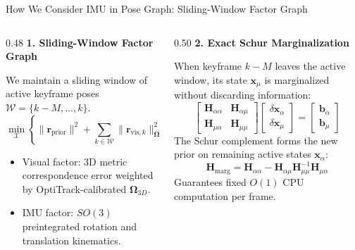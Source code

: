 \documentclass[aspectratio=169, 10pt]{beamer}
\begin{document}
\begin{frame}{How We Consider IMU in Pose Graph: Sliding-Window Factor Graph}
  \begin{columns}[T]
    \begin{column}{0.48\textwidth}
      {\small \textbf{\textcolor{NavyBlue}{1. Sliding-Window Factor Graph}}}
      \vspace{0.1cm}

      We maintain a sliding window of active keyframe poses $\mathcal{W} = \{k-M, \dots, k\}$.
      \begin{equation}
        \min_{\mathcal{X}} \left\{ \|\mathbf{r}_{\text{prior}}\|^2 + \sum_{k \in \mathcal{W}} \|\mathbf{r}_{\text{vis}, k}\|_{\mathbf{\Omega}_{3D, k}}^2 + \sum_{k \in \mathcal{W}} \|\mathbf{r}_{\text{IMU}, k}\|_{\mathbf{\Sigma}_{\text{IMU}}^{-1}}^2 \right\}
      \end{equation}
      \begin{itemize}
        \setlength{\itemsep}{2pt}
        \item Visual factor: 3D metric correspondence error weighted by OptiTrack-calibrated $\mathbf{\Omega}_{3D}$.
        \item IMU factor: $SO(3)$ preintegrated rotation and translation kinematics.
      \end{itemize}
    \end{column}

    \begin{column}{0.50\textwidth}
      {\small \textbf{\textcolor{NavyBlue}{2. Exact Schur Marginalization}}}
      \vspace{0.1cm}

      When keyframe $k-M$ leaves the active window, its state $\mathbf{x}_{\mu}$ is marginalized without discarding information:
      \begin{equation}
        \begin{bmatrix} \mathbf{H}_{\alpha\alpha} & \mathbf{H}_{\alpha\mu} \\ \mathbf{H}_{\mu\alpha} & \mathbf{H}_{\mu\mu} \end{bmatrix} \begin{bmatrix} \delta \mathbf{x}_{\alpha} \\ \delta \mathbf{x}_{\mu} \end{bmatrix} = \begin{bmatrix} \mathbf{b}_{\alpha} \\ \mathbf{b}_{\mu} \end{bmatrix}
      \end{equation}
      The Schur complement forms the new prior on remaining active states $\mathbf{x}_{\alpha}$:
      \begin{equation}
        \mathbf{H}_{\text{marg}} = \mathbf{H}_{\alpha\alpha} - \mathbf{H}_{\alpha\mu} \mathbf{H}_{\mu\mu}^{-1} \mathbf{H}_{\mu\alpha}
      \end{equation}
      Guarantees fixed $O(1)$ CPU computation per frame.
    \end{column}
  \end{columns}
\end{frame}
\end{document}
